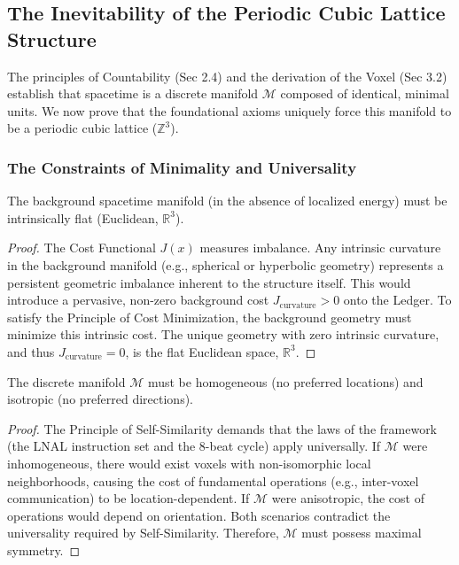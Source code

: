 \subsection{The Inevitability of the Periodic Cubic Lattice Structure}
\label{sec:lattice-derivation}

The principles of Countability (Sec 2.4) and the derivation of the Voxel (Sec 3.2) establish that spacetime is a discrete manifold $\mathcal{M}$ composed of identical, minimal units. We now prove that the foundational axioms uniquely force this manifold to be a periodic cubic lattice ($\mathbb{Z}^3$).

\subsubsection{The Constraints of Minimality and Universality}

\begin{lemma}\label{lem:flat-background}
The background spacetime manifold (in the absence of localized energy) must be intrinsically flat (Euclidean, $\mathbb{R}^3$).
\end{lemma}
\begin{proof}
The Cost Functional $J(x)$ measures imbalance. Any intrinsic curvature in the background manifold (e.g., spherical or hyperbolic geometry) represents a persistent geometric imbalance inherent to the structure itself. This would introduce a pervasive, non-zero background cost $J_{\text{curvature}} > 0$ onto the Ledger. To satisfy the Principle of Cost Minimization, the background geometry must minimize this intrinsic cost. The unique geometry with zero intrinsic curvature, and thus $J_{\text{curvature}}=0$, is the flat Euclidean space, $\mathbb{R}^3$.
\end{proof}

\begin{lemma}\label{lem:homogeneity-isotropy}
The discrete manifold $\mathcal{M}$ must be homogeneous (no preferred locations) and isotropic (no preferred directions).
\end{lemma}
\begin{proof}
The Principle of Self-Similarity demands that the laws of the framework (the LNAL instruction set and the 8-beat cycle) apply universally. If $\mathcal{M}$ were inhomogeneous, there would exist voxels with non-isomorphic local neighborhoods, causing the cost of fundamental operations (e.g., inter-voxel communication) to be location-dependent. If $\mathcal{M}$ were anisotropic, the cost of operations would depend on orientation. Both scenarios contradict the universality required by Self-Similarity. Therefore, $\mathcal{M}$ must possess maximal symmetry.
\end{proof}

